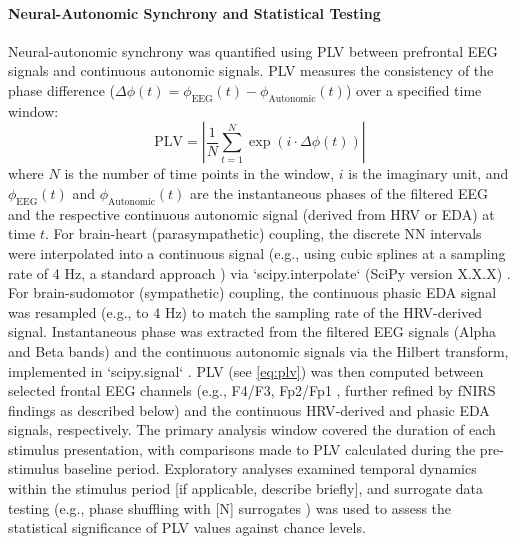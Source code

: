 \paragraph{Neural-Autonomic Synchrony and Statistical Testing}
Neural-autonomic synchrony was quantified using \gls{PLV} \parencite{lachauxMeasuringPhaseSynchrony1999} between prefrontal \gls{EEG} signals and continuous autonomic signals. \gls{PLV} measures the consistency of the phase difference ($\Delta\phi(t) = \phi_{\text{EEG}}(t) - \phi_{\text{Autonomic}}(t)$) over a specified time window:
\begin{equation}
    \text{PLV} = \left| \frac{1}{N} \sum_{t=1}^{N} \exp(i \cdot \Delta\phi(t)) \right|
    \label{eq:plv} %
\end{equation}
where $N$ is the number of time points in the window, $i$ is the imaginary unit, and $\phi_{\text{EEG}}(t)$ and $\phi_{\text{Autonomic}}(t)$ are the instantaneous phases of the filtered \gls{EEG} and the respective continuous autonomic signal (derived from \gls{HRV} or \gls{EDA}) at time $t$. For brain-heart (parasympathetic) coupling, the discrete \gls{NN intervals} were interpolated into a continuous signal (e.g., using cubic splines at a sampling rate of 4 Hz, a standard approach \parencite{lagunaPowerSpectralDensity1998, shafferOverviewHeartRate2017}) via `scipy.interpolate` (SciPy version X.X.X) \parencite{virtanenSciPy10Fundamental2020}. For brain-sudomotor (sympathetic) coupling, the continuous phasic \gls{EDA} signal was resampled (e.g., to 4 Hz) to match the sampling rate of the \gls{HRV}-derived signal. Instantaneous phase was extracted from the filtered \gls{EEG} signals (Alpha and Beta bands) and the continuous autonomic signals via the Hilbert transform, implemented in `scipy.signal` \parencite{virtanenSciPy10Fundamental2020}. \gls{PLV} (see \autoref{eq:plv}) was then computed between selected frontal \gls{EEG} channels (e.g., F4/F3, Fp2/Fp1 \parencite{rodriguesMethodsMatterExamination2021}, further refined by \gls{fNIRS} findings as described below) and the continuous \gls{HRV}-derived and phasic \gls{EDA} signals, respectively. The primary analysis window covered the duration of each stimulus presentation, with comparisons made to \gls{PLV} calculated during the pre-stimulus baseline period. Exploratory analyses examined temporal dynamics within the stimulus period [if applicable, describe briefly], and surrogate data testing (e.g., phase shuffling with [N] surrogates \parencite{cohenAnalyzingNeuralTime2014}) was used to assess the statistical significance of \gls{PLV} values against chance levels.

